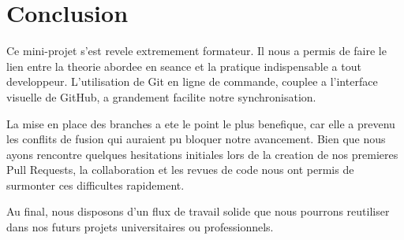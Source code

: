 \documentclass[12pt,a4paper]{article}
\begin{document}
\section{Conclusion}

Ce mini-projet s'est revele extremement formateur. Il nous a permis de faire le lien entre la theorie abordee en seance et la pratique indispensable a tout developpeur. L'utilisation de Git en ligne de commande, couplee a l'interface visuelle de GitHub, a grandement facilite notre synchronisation.

La mise en place des branches a ete le point le plus benefique, car elle a prevenu les conflits de fusion qui auraient pu bloquer notre avancement. Bien que nous ayons rencontre quelques hesitations initiales lors de la creation de nos premieres Pull Requests, la collaboration et les revues de code nous ont permis de surmonter ces difficultes rapidement.

Au final, nous disposons d'un flux de travail solide que nous pourrons reutiliser dans nos futurs projets universitaires ou professionnels.
\end{document}
